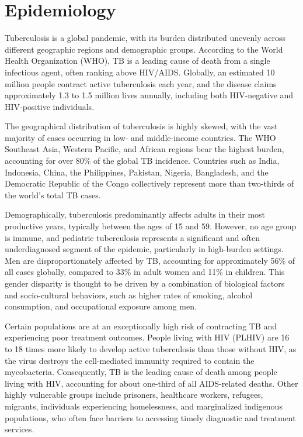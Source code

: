 \section*{Epidemiology}
Tuberculosis is a global pandemic, with its burden distributed unevenly across different geographic regions and demographic groups. According to the World Health Organization (WHO), TB is a leading cause of death from a single infectious agent, often ranking above HIV/AIDS. Globally, an estimated 10 million people contract active tuberculosis each year, and the disease claims approximately 1.3 to 1.5 million lives annually, including both HIV-negative and HIV-positive individuals.

The geographical distribution of tuberculosis is highly skewed, with the vast majority of cases occurring in low- and middle-income countries. The WHO Southeast Asia, Western Pacific, and African regions bear the highest burden, accounting for over 80\% of the global TB incidence. Countries such as India, Indonesia, China, the Philippines, Pakistan, Nigeria, Bangladesh, and the Democratic Republic of the Congo collectively represent more than two-thirds of the world's total TB cases.

Demographically, tuberculosis predominantly affects adults in their most productive years, typically between the ages of 15 and 59. However, no age group is immune, and pediatric tuberculosis represents a significant and often underdiagnosed segment of the epidemic, particularly in high-burden settings. Men are disproportionately affected by TB, accounting for approximately 56\% of all cases globally, compared to 33\% in adult women and 11\% in children. This gender disparity is thought to be driven by a combination of biological factors and socio-cultural behaviors, such as higher rates of smoking, alcohol consumption, and occupational exposure among men.

Certain populations are at an exceptionally high risk of contracting TB and experiencing poor treatment outcomes. People living with HIV (PLHIV) are 16 to 18 times more likely to develop active tuberculosis than those without HIV, as the virus destroys the cell-mediated immunity required to contain the mycobacteria. Consequently, TB is the leading cause of death among people living with HIV, accounting for about one-third of all AIDS-related deaths. Other highly vulnerable groups include prisoners, healthcare workers, refugees, migrants, individuals experiencing homelessness, and marginalized indigenous populations, who often face barriers to accessing timely diagnostic and treatment services.

